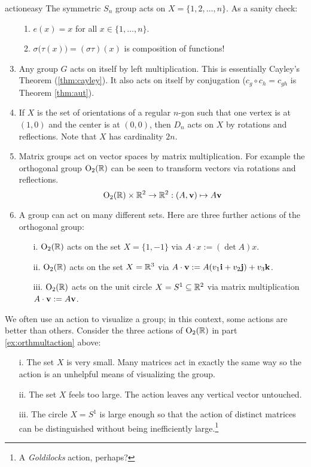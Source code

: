 \begin{examples}{}{actioneasy}
\exstart The symmetric $S_n$ group acts on $X=\{1,2,\ldots,n\}$. As a sanity check:\vspace{-3pt}
\begin{enumerate}\setcounter{enumi}{1}
  \item[]\begin{enumerate}
		\item $e(x)=x$ for all $x\in \{1,\ldots,n\}$.
		\item $\sigma\bigl(\tau(x)\bigr)=(\sigma\tau)(x)$ is composition of functions!
	\end{enumerate}
  \item Any group $G$ acts on itself by left multiplication. This is essentially Cayley's Theorem (\ref{thm:cayley}). It also acts on itself by conjugation ($c_g\circ c_h=c_{gh}$ is Theorem \ref{thm:aut}).
  \item If $X$ is the set of orientations of a regular $n$-gon such that one vertex is at $(1,0)$ and the center is at $(0,0)$, then $D_n$ acts on $X$ by rotations and reflections. Note that $X$ has cardinality $2n$.
  \item Matrix groups act on vector spaces by matrix multiplication. For example the orthogonal group $\mathrm{O}_2(\mathbb{R})$ can be seen to transform vectors via rotations and reflections.
	\[
		\mathrm{O}_2(\mathbb{R})\times\mathbb{R}^2\to\mathbb{R}^2:(A,{\mathbf{v}})\mapsto A{\mathbf{v}}
	\]
  
  \item\label{ex:orthmultaction} A group can act on many different sets. Here are three further actions of the orthogonal group:
	\begin{enumerate}
  	\item[i.] $\mathrm{O}_2(\mathbb{R})$ acts on the set $X=\{1,-1\}$ via $A\cdot x:=(\det A)x$.
		\item[ii.] $\mathrm{O}_2(\mathbb{R})$ acts on the set $X=\mathbb{R}^3$ via $A\cdot{\mathbf{v}}:=A(v_1{\mathbf{i}}+v_2{\mathbf{j}})+v_3{\mathbf{k}}$.
		\item[iii.] $\mathrm{O}_2(\mathbb{R})$ acts on the unit circle $X=S^1\subseteq\mathbb{R}^2$ via matrix multiplication $A\cdot{\mathbf{v}}:=A{\mathbf{v}}$.
	\end{enumerate}
\end{enumerate}
\end{examples}

We often use an action to visualize a group; in this context, some actions are better than others. Consider the three actions of $\mathrm{O}_2(\mathbb{R})$ in part \ref*{ex:orthmultaction} above:
\begin{enumerate}\itemsep0pt
  \item[i.] The set $X$ is very small. Many matrices act in exactly the same way so the action is an unhelpful means of visualizing the group.
	\item[ii.] The set $X$ feels too large. The action leaves any vertical vector untouched.
	\item[iii.] The circle $X=S^1$ is large enough so that the action of distinct matrices can be distinguished without being inefficiently large.\footnote{A \emph{Goldilocks} action, perhaps?}
\end{enumerate}

